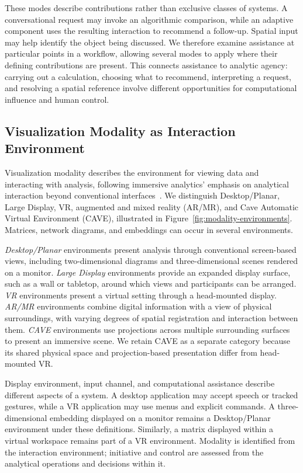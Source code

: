 These modes describe contributions rather than exclusive classes of systems. A conversational request may invoke an algorithmic comparison, while an adaptive component uses the resulting interaction to recommend a follow-up. Spatial input may help identify the object being discussed. We therefore examine assistance at particular points in a workflow, allowing several modes to apply where their defining contributions are present. This connects assistance to analytic agency: carrying out a calculation, choosing what to recommend, interpreting a request, and resolving a spatial reference involve different opportunities for computational influence and human control.

\subsection{Visualization Modality as Interaction Environment}
\label{subsection:modalityenvironment}

Visualization modality describes the environment for viewing data and interacting with analysis, following immersive analytics' emphasis on analytical interaction beyond conventional interfaces~\cite{Marriott2018ImmersiveAnalytics}. We distinguish Desktop/Planar, Large Display, VR, augmented and mixed reality (AR/MR), and Cave Automatic Virtual Environment (CAVE), illustrated in Figure~\ref{fig:modality-environments}. Matrices, network diagrams, and embeddings can occur in several environments.



\emph{Desktop/Planar} environments present analysis through conventional screen-based views, including two-dimensional diagrams and three-dimensional scenes rendered on a monitor. \emph{Large Display} environments provide an expanded display surface, such as a wall or tabletop, around which views and participants can be arranged. \emph{VR} environments present a virtual setting through a head-mounted display. \emph{AR/MR} environments combine digital information with a view of physical surroundings, with varying degrees of spatial registration and interaction between them. \emph{CAVE} environments use projections across multiple surrounding surfaces to present an immersive scene. We retain CAVE as a separate category because its shared physical space and projection-based presentation differ from head-mounted VR.

Display environment, input channel, and computational assistance describe different aspects of a system. A desktop application may accept speech or tracked gestures, while a VR application may use menus and explicit commands. A three-dimensional embedding displayed on a monitor remains a Desktop/Planar environment under these definitions. Similarly, a matrix displayed within a virtual workspace remains part of a VR environment. Modality is identified from the interaction environment; initiative and control are assessed from the analytical operations and decisions within it.

